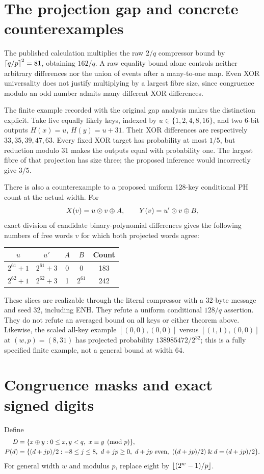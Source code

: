 \section{The projection gap and concrete counterexamples}\label{sec:gap}
The published calculation multiplies the raw $2/q$ compressor bound by $\left\lceil q/p\right\rceil^2=81$, obtaining $162/q$\cite[pp.~6 and 19]{khuong2022}. A raw equality bound alone controls neither arbitrary differences nor the union of events after a many-to-one map. Even XOR universality does not justify multiplying by a largest fibre size, since congruence modulo an odd number admits many different XOR differences.

The finite example recorded with the original gap analysis makes the distinction explicit\cite{gap}. Take five equally likely keys, indexed by $u\in\{1,2,4,8,16\}$, and two 6-bit outputs $H(x)=u$, $H(y)=u+31$. Their XOR differences are respectively $33,35,39,47,63$. Every fixed XOR target has probability at most $1/5$, but reduction modulo 31 makes the outputs equal with probability one. The largest fibre of that projection has size three; the proposed inference would incorrectly give $3/5$.

There is also a counterexample to a proposed uniform 128-key conditional PH count at the actual width. For
\[
 X(v)=u\odot v\mathbin\oplus A,\qquad Y(v)=u'\odot v\mathbin\oplus B,
\]
exact division of candidate binary-polynomial differences gives the following numbers of free words $v$ for which both projected words agree:
\begin{center}
\begin{tabular}{@{}ccccc@{}}\toprule
$u$&$u'$&$A$&$B$&Count\\\midrule
$2^{61}+1$&$2^{61}+3$&0&0&183\\
$2^{62}+1$&$2^{62}+3$&1&$2^{61}$&242\\\bottomrule
\end{tabular}
\end{center}
These slices are realizable through the literal compressor with a 32-byte message and seed 32, including ENH. They refute a uniform conditional $128/q$ assertion. They do not refute an averaged bound on all keys or either theorem above. Likewise, the scaled all-key example $[(0,0),(0,0)]$ versus $[(1,1),(0,0)]$ at $(w,p)=(8,31)$ has projected probability $138985472/2^{32}$; this is a fully specified finite example, not a general bound at width 64.

\section{Congruence masks and exact signed digits}\label{sec:masks}
Define
\begin{align}
 D&=\{x\mathbin\oplus y:0\le x,y<q,\ x\equiv y\pmod p\},\nonumber\\
 P(d)&=\{(d+jp)/2: -8\le j\le8,\ d+jp\ge0,\ d+jp\text{ even},\
 ((d+jp)/2)\mathbin{\&} d=(d+jp)/2\}.\label{eq:patterns}
\end{align}
For general width $w$ and modulus $p$, replace eight by $\left\lfloor(2^w-1)/p\right\rfloor$.

